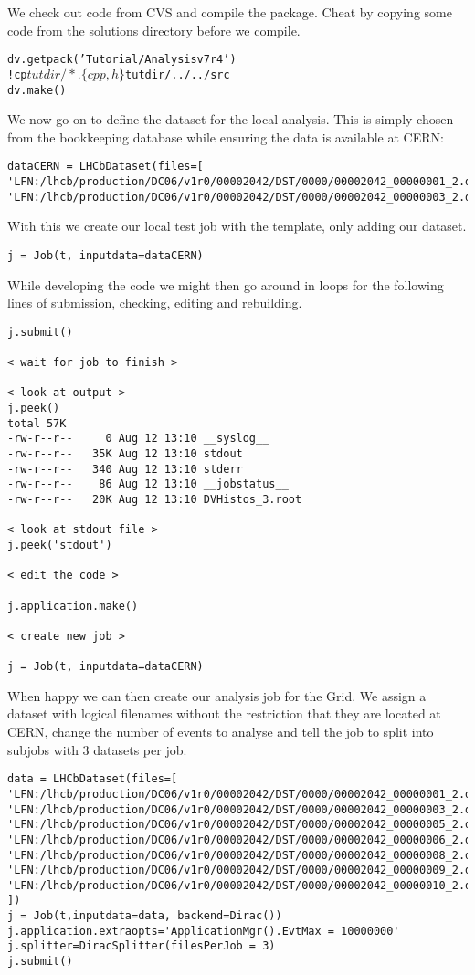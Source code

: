 \documentclass{howto}
\def\tutorialv {v7r4\xspace}
\begin{document}
We check out code from CVS and compile the package. Cheat by copying some
code from the solutions directory before we compile.
\begin{alltt}
dv.getpack('Tutorial/Analysis \tutorialv')
!cp $tutdir/*.\{cpp,h\} $tutdir/../../src
dv.make()
\end{alltt}
We now go on to define the dataset for the local analysis. This is simply
chosen from the bookkeeping database while ensuring the data is available at
CERN:
\begin{verbatim}
dataCERN = LHCbDataset(files=[
'LFN:/lhcb/production/DC06/v1r0/00002042/DST/0000/00002042_00000001_2.dst',
'LFN:/lhcb/production/DC06/v1r0/00002042/DST/0000/00002042_00000003_2.dst'])
\end{verbatim}
With this we create our local test job with the template, only adding our
dataset.
\begin{verbatim}
j = Job(t, inputdata=dataCERN)
\end{verbatim}
While developing the code we might then go around in loops for the following
lines of submission, checking, editing and rebuilding.
\begin{verbatim}
j.submit()

< wait for job to finish >

< look at output >
j.peek()
total 57K
-rw-r--r--     0 Aug 12 13:10 __syslog__
-rw-r--r--   35K Aug 12 13:10 stdout
-rw-r--r--   340 Aug 12 13:10 stderr
-rw-r--r--    86 Aug 12 13:10 __jobstatus__
-rw-r--r--   20K Aug 12 13:10 DVHistos_3.root

< look at stdout file >
j.peek('stdout')

< edit the code >

j.application.make()

< create new job >

j = Job(t, inputdata=dataCERN)
\end{verbatim}
When happy we can then create our analysis job for the Grid. We assign a
dataset with logical filenames without the restriction that they are located
at CERN, change the number of events to analyse and tell the job to split into
subjobs with 3 datasets per job.
\begin{verbatim}
data = LHCbDataset(files=[
'LFN:/lhcb/production/DC06/v1r0/00002042/DST/0000/00002042_00000001_2.dst',
'LFN:/lhcb/production/DC06/v1r0/00002042/DST/0000/00002042_00000003_2.dst',
'LFN:/lhcb/production/DC06/v1r0/00002042/DST/0000/00002042_00000005_2.dst',
'LFN:/lhcb/production/DC06/v1r0/00002042/DST/0000/00002042_00000006_2.dst',
'LFN:/lhcb/production/DC06/v1r0/00002042/DST/0000/00002042_00000008_2.dst',
'LFN:/lhcb/production/DC06/v1r0/00002042/DST/0000/00002042_00000009_2.dst',
'LFN:/lhcb/production/DC06/v1r0/00002042/DST/0000/00002042_00000010_2.dst'
])
j = Job(t,inputdata=data, backend=Dirac())
j.application.extraopts='ApplicationMgr().EvtMax = 10000000'
j.splitter=DiracSplitter(filesPerJob = 3)
j.submit()
\end{verbatim}
\end{document}
